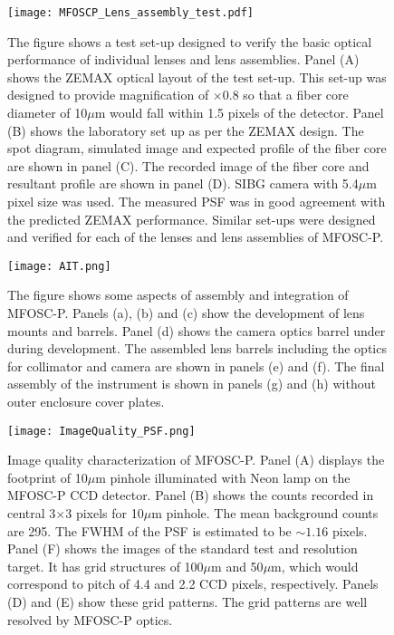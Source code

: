 
\begin{figure*}
	\centering
	\texttt{[image: MFOSCP\_Lens\_assembly\_test.pdf]}
	\vspace{0.2cm}
	\caption{The figure shows a test set-up designed to verify the basic optical performance of individual lenses and lens assemblies. Panel (A) shows the ZEMAX optical layout of the test set-up. This set-up was designed to provide magnification of $\times$0.8 so that a fiber core diameter of 10$\mu$m would fall within 1.5 pixels of the detector. Panel (B) shows the laboratory set up as per the ZEMAX design. The spot diagram, simulated image and expected profile of the fiber core are shown in panel (C). The recorded image of the fiber core and resultant profile are shown in panel (D). SIBG camera with 5.4$\mu$m pixel size was used. The measured PSF was in good agreement with the predicted ZEMAX performance. Similar set-ups were designed and verified for each of the lenses and lens assemblies of MFOSC-P.} 
	\label{fig-LensCheckSetup}
\end{figure*}


\begin{figure*}
	\centering
	\texttt{[image: AIT.png]}
	\vspace{0.2cm}
	\caption{ The figure shows some aspects of assembly and integration of MFOSC-P. Panels (a), (b) and (c) show the development of lens mounts and barrels. Panel (d) shows the camera optics barrel under during development. The assembled lens barrels including the optics for collimator and camera are shown in panels (e) and (f). The final assembly of the instrument is shown in panels (g) and (h) without outer enclosure cover plates.}
	\label{fig-AIT}
\end{figure*}


\begin{figure}
	\centering
	\texttt{[image: ImageQuality\_PSF.png]}
	\vspace{0.2cm}
	\caption{Image quality characterization of MFOSC-P. Panel (A) displays the footprint of 10$\mu$m pinhole illuminated with Neon lamp on the MFOSC-P CCD detector. Panel (B) shows the counts recorded in central 3$\times$3 pixels for 10$\mu$m pinhole. The mean background counts are 295. The FWHM of the PSF is estimated to be $\sim1.16$ pixels. Panel (F) shows the images of the standard test and resolution target. It has grid structures of 100$\mu$m and 50$\mu$m, which would correspond to pitch of 4.4 and 2.2 CCD pixels, respectively. Panels (D) and (E) show these grid patterns. The grid patterns are well resolved by MFOSC-P optics.} 
	\label{fig-IQ_PSF}
\end{figure}



